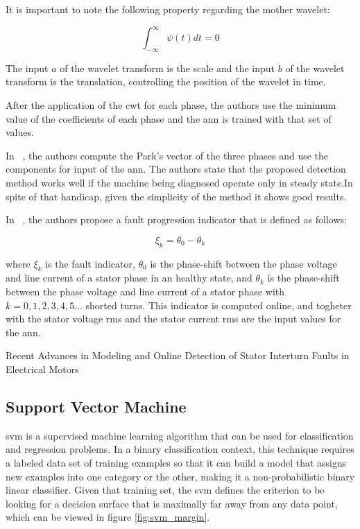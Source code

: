 It is important to note the following property regarding the mother wavelet:

\begin{equation} 
\label{eq:mother_wavelet_sum}
   \int_{- \infty}^{\infty}  \psi(t) dt = 0
\end{equation}

The input $a$ of the wavelet transform is the scale and the input $b$ of the wavelet transform is the translation, controlling the position of the wavelet in time.

After the application of the \acrshort{cwt} for each phase, the authors use the minimum value of the coefficients of each phase and the \acrshort{ann} is trained with that set of values.



In ~\cite{Ourici2012}, the authors compute the Park's vector of the three phases and use the components for input of the \acrshort{ann}. The authors state that the proposed detection method works well if the machine being diagnosed operate only in steady state.In spite of that handicap, given the simplicity of the method it shows good results.

In ~\cite{Wolkiewicz2013}, the authors propose a fault progression indicator that is defined as follows:

\begin{equation} 
\label{eq:fault_progression_indicator}
   \xi_k = \theta_0 - \theta_k
\end{equation}

where $\xi_k$ is the fault indicator, $\theta_0$ is the phase-shift between the phase voltage and line current of a stator phase in an healthy state, and $\theta_k$ is the phase-shift between the phase voltage and line current of a stator phase with $k = 0,1,2,3,4,5...$ shorted turns.
This indicator is computed online, and togheter with the stator voltage \acrshort{rms} and the stator current \acrshort{rms} are the input values for the \acrshort{ann}.

Recent Advances in Modeling and Online Detection of Stator Interturn Faults in Electrical Motors


\subsection{Support Vector Machine} %
\label{sec:svm}

\Acrfull{svm} is a supervised machine learning algorithm that can be used for classification and regression problems. In a binary classification context, this technique requires a labeled data set of training examples so that it can build a model that assigns new examples into one category or the other, making it a non-probabilistic binary linear classifier.
Given that training set, the \Acrshort{svm} defines the criterion to be looking for a decision surface that is maximally far away from any data point, which can be viewed in figure \ref{fig:svm_margin}. 

